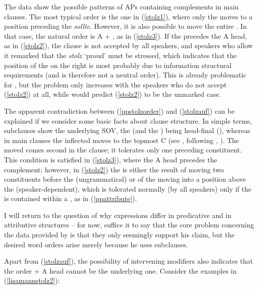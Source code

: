 The data show the possible  patterns of APs containing  complements in main clauses. The most typical order is the one in (\ref{stolz1}), where only the  moves to a position preceding the  \textit{sollte}. However, it is also possible to move the entire . In that case, the natural order is A + , as in (\ref{stolz3}). If the  precedes the A head, as in (\ref{stolz2}), the clause is not accepted by all speakers, and speakers who allow it remarked that the  \textit{stolz} `proud' must be stressed, which indicates that the position of the  on the right is most probably due to information structural requirements (and is therefore not a neutral order). This is already problematic for \citet[26]{lechner2004}, but the problem only increases with the speakers who do not accept (\ref{stolz2}) at all, while \citet{lechner2004} would predict (\ref{stolz2}) to be the unmarked case.

The apparent contradiction between (\ref{ppstolzorder}) and (\ref{stolzauf}) can be explained if we consider some basic facts about  clause structure. In simple terms, subclauses show the underlying  SOV, the  (and the ) being head-final (\citealt[34]{haider1985}), whereas in main clauses the inflected  moves to the topmost C (see \citealt[30]{fanselow2004}, following \citealt{denbesten1989}, \citealt[133--134]{richtersailer1998}). The moved  comes second in the clause; it tolerates only one preceding constituent. This condition is satisfied in (\ref{stolz3}), where the A head precedes the  complement; however, in (\ref{stolz2}) the  is either the result of moving two constituents before the  (ungrammatical) or of the  moving into a position above the  (speaker-dependent), which is tolerated normally (by all speakers) only if the  is contained within a , as in (\ref{ppattribute}). 

I will return to the question of why  expressions differ in predicative and in attributive structures -- for now, suffice it to say that the core problem concerning the data provided by \citet{lechner2004} is that they only seemingly support his claim, but the desired word orders arise merely because he uses subclauses.

Apart from (\ref{stolzauf}), the possibility of intervening modifiers also indicates that the order  + A head cannot be the underlying one. Consider the examples in (\ref{lisamannstolz2}):

